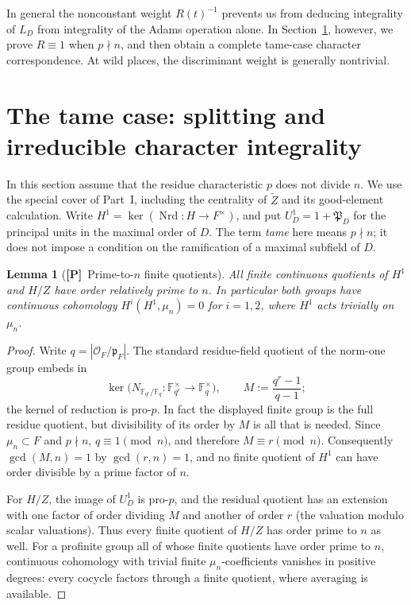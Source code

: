 \documentclass[11pt]{article}
\newcommand{\Nrd}{\operatorname{Nrd}}
\newcommand{\tZ}{\widetilde Z}
\newcommand{\Ptag}{\textnormal{\textbf{[P]}}}
\theoremstyle{plain}
\newtheorem{lemma}[theorem]{Lemma}
\theoremstyle{definition}
\begin{document}
In general the nonconstant weight $R(t)^{-1}$ prevents us from deducing integrality of $L_D$ from integrality of the Adams operation alone. In Section~\ref{sec:tame}, however, we prove $R\equiv1$ when $p\nmid n$, and then obtain a complete tame-case character correspondence. At wild places, the discriminant weight is generally nontrivial.


\section{The tame case: splitting and irreducible character integrality}\label{sec:tame}
In this section assume that the residue characteristic $p$ does not divide $n$.
We use the special cover of Part~I, including the centrality of $\tZ$ and
its good-element calculation. Write $H^1=\ker(\Nrd:H\to F^\times)$,
and put $U_D^1=1+\mathfrak P_D$ for the principal units in the maximal
order of $D$. The term \emph{tame} here means $p\nmid n$; it does not
impose a condition on the ramification of a maximal subfield of $D$.

\begin{lemma}[\Ptag\ Prime-to-$n$ finite quotients]\label{lem:prime-to-n}
All finite continuous quotients of $H^1$ and $H/Z$ have order relatively
prime to $n$. In particular both groups have continuous cohomology
$H^i(H^1,\mu_n)=0$ for $i=1,2$, where $H^1$ acts trivially on $\mu_n$.
\end{lemma}
\begin{proof}
Write $q=|\mathcal O_F/\mathfrak p_F|$. The standard residue-field
quotient of the norm-one group embeds in
\[
\ker\bigl(N_{\mathbb F_{q^r}/\mathbb F_q}:
\mathbb F_{q^r}^\times\longrightarrow\mathbb F_q^\times\bigr),
\qquad M:=\frac{q^r-1}{q-1};
\]
the kernel of reduction is pro-$p$. In fact the displayed finite group
is the full residue quotient, but divisibility of its order by $M$ is
all that is needed. Since $\mu_n\subset F$ and $p\nmid n$,
$q\equiv1\pmod n$, and therefore $M\equiv r\pmod n$.
Consequently $\gcd(M,n)=1$ by $\gcd(r,n)=1$, and no finite quotient
of $H^1$ can have order divisible by a prime factor of $n$.

For $H/Z$, the image of $U_D^1$ is pro-$p$, and the residual quotient
has an extension with one factor of order dividing $M$ and another
of order $r$ (the valuation modulo scalar valuations). Thus every
finite quotient of $H/Z$ has order prime to $n$ as well.
For a profinite group all of whose finite quotients have order
prime to $n$, continuous cohomology with trivial finite
$\mu_n$-coefficients vanishes in positive degrees: every cocycle
factors through a finite quotient, where averaging is available.
\end{proof}
\end{document}
